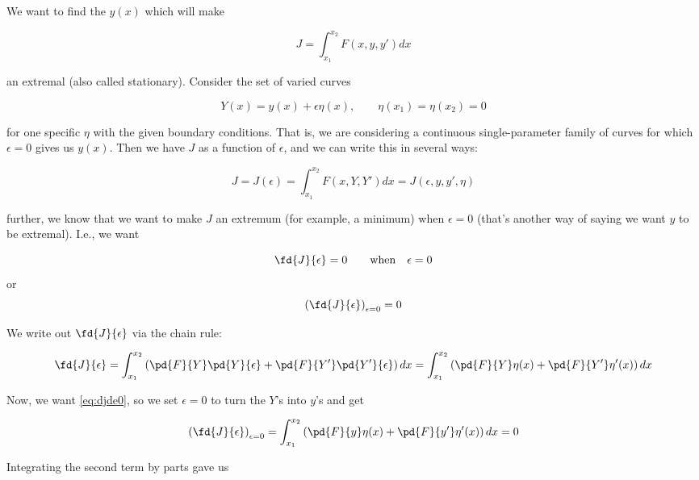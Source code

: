 \documentclass[12pt]{article}
\numberwithin{equation}{section}
\begin{document}
We want to find the $y(x)$ which will make

\begin{equation}
  J = \int_{x_1}^{x_2}F(x,y,y')dx
\end{equation}

an extremal (also called stationary). Consider the set of varied curves

\begin{equation}
  Y(x) = y(x) + \epsilon\eta(x), \qquad \eta(x_1) = \eta(x_2) = 0
\end{equation}

for one specific $\eta$ with the given boundary conditions. That is, we are considering a continuous single-parameter family of curves for which $\epsilon=0$ gives us $y(x)$. Then we have $J$ as a function of $\epsilon$, and we can write this in several ways:

\begin{equation}
  J = J(\epsilon) = \int_{x_1}^{x_2}F(x,Y,Y')dx = J(\epsilon,y,y',\eta)
\end{equation}

further, we know that we want to make $J$ an extremum (for example, a minimum) when $\epsilon=0$ (that's another way of saying we want $y$ to be extremal). I.e., we want

\begin{equation*}
  \fd{J}{\epsilon}=0 \qquad\textrm{when}\quad\epsilon=0
\end{equation*}
or
\begin{equation}
  \label{eq:djde0}
  \left( \fd{J}{\epsilon}\right)_{\epsilon=0} = 0
\end{equation}

We write out $\fd{J}{\epsilon}$ via the chain rule:

\begin{equation}
  \label{eq:djdechain}
  \fd{J}{\epsilon} = \int_{x_1}^{x_2}\left(\pd{F}{Y}\pd{Y}{\epsilon} + \pd{F}{Y'}\pd{Y'}{\epsilon}\right) dx
 = \int_{x_1}^{x_2}\left(\pd{F}{Y}\eta(x) + \pd{F}{Y'}\eta'(x)\right) dx
\end{equation}

Now, we want \ref{eq:djde0}, so we set $\epsilon=0$ to turn the $Y$'s into $y$'s and get

\begin{equation}
  \left( \fd{J}{\epsilon}\right)_{\epsilon=0} =  \int_{x_1}^{x_2}\left(\pd{F}{y}\eta(x) + \pd{F}{y'}\eta'(x)\right) dx = 0
\end{equation}

Integrating the second term by parts gave us
\end{document}
